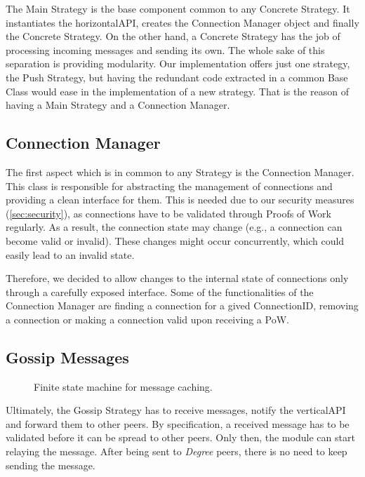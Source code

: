 \documentclass[a4paper,english,10pt,NET]{tumarticle}
\begin{document}
The Main Strategy is the base component common to any Concrete Strategy. It instantiates the horizontalAPI, creates the Connection Manager object and finally the Concrete Strategy. On the other hand, a Concrete Strategy  has the job of processing incoming messages and sending its own. The whole sake of this separation is providing modularity. Our implementation offers just one strategy, the Push Strategy, but having the redundant code extracted in a common Base Class would ease in the implementation of a new strategy. That is the reason of having a Main Strategy and a Connection Manager.


\subsection{Connection Manager}

The first aspect which is in common to any Strategy is the Connection Manager. This class is responsible for abstracting the management of connections and providing a clean interface for them. This is needed due to our security measures (\cref{sec:security}), as connections have to be validated through Proofs of Work regularly. As a result, the connection state may change (e.g., a connection can become valid or invalid). These changes might occur concurrently, which could easily lead to an invalid state.

Therefore, we decided to allow changes to the internal state of connections only through a carefully exposed interface. Some of the functionalities of the Connection Manager are finding a connection for a gived ConnectionID, removing a connection or making a connection valid upon receiving a PoW.

\subsection{Gossip Messages}

\begin{figure}
	\centering
	
	\caption{Finite state machine for message caching.}
	\label{fig:fsm_msgs}
\end{figure}

Ultimately, the Gossip Strategy has to receive messages, notify the verticalAPI and forward them to other peers. By specification, a received message has to be validated before it can be spread to other peers. Only then, the module can start relaying the message. After being sent to \textit{Degree} peers, there is no need to keep sending the message. 
\end{document}
